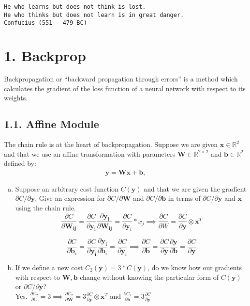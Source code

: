 \documentclass[12pt,letterpaper]{article}
\newcommand{\matr}[1]{\bm{#1}}     %
\newcommand{\vect}[1]{\bm{#1}}     %
\begin{document}
\begin{center}
\texttt{He who learns but does not think is lost. \\He who thinks but does not learn is in great danger. \\ Confucius (551 - 479 BC)}

\end{center}

\section*{1. Backprop}

Backpropagation or ``backward propagation through errors'' is a method which calculates the gradient of the loss function of a neural network with respect to its weights. 

\subsection*{1.1. Affine Module}
The chain rule is at the heart of backpropagation. Suppose we are given $\vect{x} \in \mathbb{R}^2$ and that we use an affine transformation with parameters
$\matr{W} \in \mathbb{R}^{2\times 2}$ and $\vect{b}\in \mathbb{R}^2$ defined by:
\begin{align}
\vect{y} = \matr{W} \vect{x} + \vect{b},
\end{align}
\begin{enumerate}[(a)]
    \item Suppose an arbitrary cost function $C(\vect{y})$ and that we are given the gradient $\partial C / \partial \vect{y}$. Give an expression for $ \partial C / \partial \matr{W}$ and $ \partial C / \partial \vect{b}$ in terms of $ \partial C / \partial \vect{y}$ and $\vect{x}$ using the chain rule.    $$\frac{\partial C}{\partial \matr{W_{ij}}} =  \frac{\partial C }{\partial \vect{y_i}} \frac{\partial \vect{y_i} }{\partial \matr{W_{ij}}} = \frac{\partial C}{\partial \vect{y}_i} * x_j \implies \frac{\partial C}{\partial W} = \frac{\partial C}{\partial \vect{y}} \otimes \vect{x}^T$$
    
    $$\frac{\partial C}{\partial \vect{b}_i} = \frac{\partial C }{\partial \vect{y_i}} \frac{\partial \vect{y_i} }{\partial \vect{b}_i} = \frac{\partial C }{\partial \vect{y}_i} \implies \frac{\partial C}{\partial \vect{b}} = \frac{\partial C }{\partial \vect{y}} \frac{\partial \vect{y} }{\partial \vect{b}} = \frac{\partial C }{\partial \vect{y}}$$
    
    \item If we define a new cost $C_2(\vect{y}) = 3*C(\vect{y})$, do we know how our gradients with respect to $\vect{W,b}$ change without knowing the particular form of $C(\vect{y})$ or $ \partial C / \partial \vect{y}$?\\
    Yes. $\frac{\partial C_2}{\partial C} = 3 \implies \frac{\partial C_2}{\partial \matr{W}} = 3 \frac{\partial C}{\partial \vect{y}} \otimes \vect{x}^T $ and $\frac{\partial C_2}{\partial \vect{b}} = 3 \frac{\partial C }{\partial \vect{y}}$
\end{enumerate}
\end{document}
